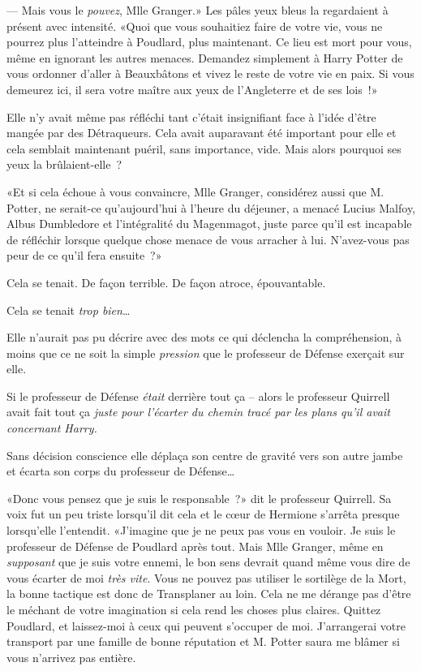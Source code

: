 --- Mais vous le \emph{pouvez}, Mlle Granger.» Les pâles yeux bleus la regardaient à présent avec intensité. «Quoi que vous souhaitiez faire de votre vie, vous ne pourrez plus l'atteindre à Poudlard, plus maintenant. Ce lieu est mort pour vous, même en ignorant les autres menaces. Demandez simplement à Harry Potter de vous ordonner d'aller à Beauxbâtons et vivez le reste de votre vie en paix. Si vous demeurez ici, il sera votre maître aux yeux de l'Angleterre et de ses lois~!»

Elle n'y avait même pas réfléchi tant c'était insignifiant face à l'idée d'être mangée par des Détraqueurs. Cela avait auparavant été important pour elle et cela semblait maintenant puéril, sans importance, vide. Mais alors pourquoi ses yeux la brûlaient-elle~?

«Et si cela échoue à vous convaincre, Mlle Granger, considérez aussi que M. Potter, ne serait-ce qu'aujourd'hui à l'heure du déjeuner, a menacé Lucius Malfoy, Albus Dumbledore et l'intégralité du Magenmagot, juste parce qu'il est incapable de réfléchir lorsque quelque chose menace de vous arracher à lui. N'avez-vous pas peur de ce qu'il fera ensuite~?»

Cela se tenait. De façon terrible. De façon atroce, épouvantable.

Cela se tenait \emph{trop bien}…

Elle n'aurait pas pu décrire avec des mots ce qui déclencha la compréhension, à moins que ce ne soit la simple \emph{pression} que le professeur de Défense exerçait sur elle.

Si le professeur de Défense \emph{était} derrière tout ça -- alors le professeur Quirrell avait fait tout ça \emph{juste pour l'écarter du chemin tracé par les plans qu'il avait concernant Harry.}

Sans décision conscience elle déplaça son centre de gravité vers son autre jambe et écarta son corps du professeur de Défense…

«Donc vous pensez que je suis le responsable~?» dit le professeur Quirrell. Sa voix fut un peu triste lorsqu'il dit cela et le cœur de Hermione s'arrêta presque lorsqu'elle l'entendit. «J'imagine que je ne peux pas vous en vouloir. Je suis le professeur de Défense de Poudlard après tout. Mais Mlle Granger, même en \emph{supposant} que je suis votre ennemi, le bon sens devrait quand même vous dire de vous écarter de moi \emph{très vite}. Vous ne pouvez pas utiliser le sortilège de la Mort, la bonne tactique est donc de Transplaner au loin. Cela ne me dérange pas d'être le méchant de votre imagination si cela rend les choses plus claires. Quittez Poudlard, et laissez-moi à ceux qui peuvent s'occuper de moi. J'arrangerai votre transport par une famille de bonne réputation et M. Potter saura me blâmer si vous n'arrivez pas entière.

